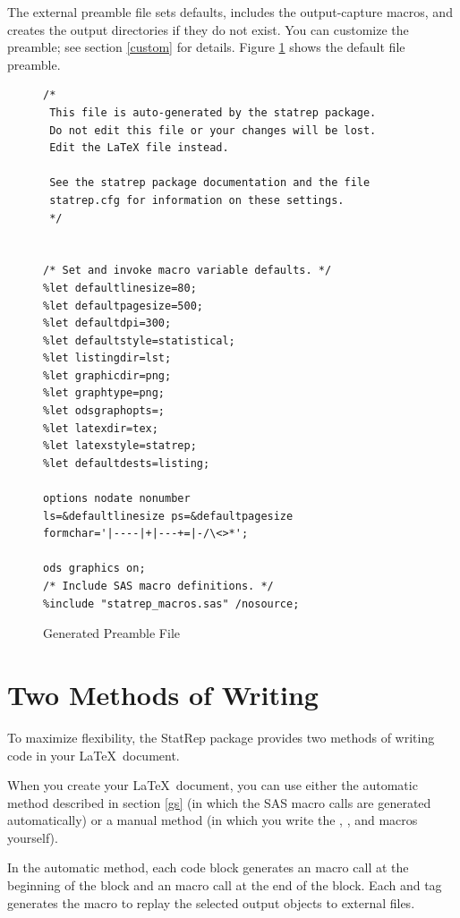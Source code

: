 \documentclass[article,oneside]{memoir}
\newcommand*{\StatRep}{\textsf{StatRep}\xspace}
\begin{document}
  The external preamble file sets defaults, includes
  the output-capture macros, and creates the output directories if they do not exist.
  You can customize the preamble; see section \ref{custom} for details.
  Figure \ref{fig:preamble} shows the default file preamble.
\begin{figure}[H]
\begin{snugshade}
\begin{verbatim}
/*
 This file is auto-generated by the statrep package.
 Do not edit this file or your changes will be lost.
 Edit the LaTeX file instead.

 See the statrep package documentation and the file
 statrep.cfg for information on these settings.
 */


/* Set and invoke macro variable defaults. */
%let defaultlinesize=80;
%let defaultpagesize=500;
%let defaultdpi=300;
%let defaultstyle=statistical;
%let listingdir=lst;
%let graphicdir=png;
%let graphtype=png;
%let odsgraphopts=;
%let latexdir=tex;
%let latexstyle=statrep;
%let defaultdests=listing;

options nodate nonumber
ls=&defaultlinesize ps=&defaultpagesize
formchar='|----|+|---+=|-/\<>*';

ods graphics on;
/* Include SAS macro definitions. */
%include "statrep_macros.sas" /nosource;

\end{verbatim}
\end{snugshade}
\caption{Generated Preamble File}\label{fig:preamble}
\end{figure}

\section{Two Methods of Writing}
  To maximize flexibility, the \StatRep package provides two methods of writing code in your
\LaTeX\ document.

When you create your \LaTeX\ document, you can use either the automatic method described in
section \ref{gs} (in which the SAS macro calls are generated automatically) or a manual
method (in which you write the , , and  macros yourself).

In the automatic method, each  code block generates an  macro call at the beginning
of the block and an  macro call at the end of the block.
Each  and  tag generates the 
macro to replay the selected output objects to external files.
\end{document}
